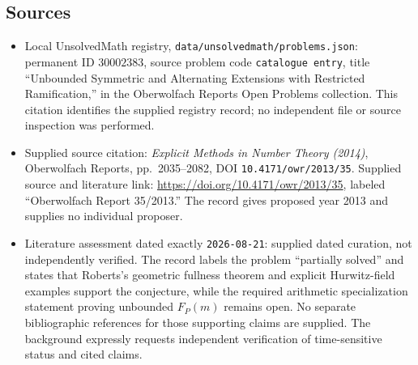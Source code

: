 \documentclass[11pt]{article}
\begin{document}
\subsection{Sources}
\begin{itemize}
\item Local UnsolvedMath registry, \texttt{data/unsolvedmath/problems.json}: permanent ID \(30002383\), source problem code \texttt{catalogue entry}, title ``Unbounded Symmetric and Alternating Extensions with Restricted Ramification,'' in the Oberwolfach Reports Open Problems collection. This citation identifies the supplied registry record; no independent file or source inspection was performed.
\item Supplied source citation: \emph{Explicit Methods in Number Theory (2014)}, Oberwolfach Reports, pp.\ 2035--2082, DOI \texttt{10.4171/owr/2013/35}. Supplied source and literature link: \url{https://doi.org/10.4171/owr/2013/35}, labeled ``Oberwolfach Report 35/2013.'' The record gives proposed year 2013 and supplies no individual proposer.
\item Literature assessment dated exactly \texttt{2026-08-21}: supplied dated curation, not independently verified. The record labels the problem ``partially solved'' and states that Roberts's geometric fullness theorem and explicit Hurwitz-field examples support the conjecture, while the required arithmetic specialization statement proving unbounded \(F_P(m)\) remains open. No separate bibliographic references for those supporting claims are supplied. The background expressly requests independent verification of time-sensitive status and cited claims.
\end{itemize}
\end{document}
